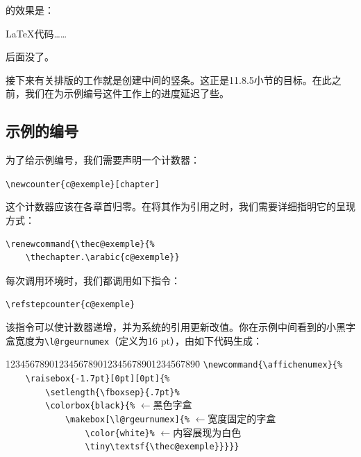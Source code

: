 的效果是：

\begin{ltxexempleii}
\LaTeX{}代码……
\par\noindent
后面没了。
\end{ltxexempleii}

接下来有关排版的工作就是创建中间的竖条。这正是11.8.5小节的目标。在此之前，我们在为示例编号这件工作上的进度延迟了些。

\subsection{示例的编号}

为了给示例编号，我们需要声明一个计数器：

\begin{dmd}
\verb|\newcounter{c@exemple}[chapter]|
\end{dmd}

这个计数器应该在各章首归零。在将其作为引用之时，我们需要详细指明它的呈现方式：

\begin{dmd}
\begin{verbatim}
\renewcommand{\thec@exemple}{% 
    \thechapter.\arabic{c@exemple}}\end{verbatim}
\end{dmd}

每次调用环境时，我们都调用如下指令：

\begin{dmd}
\verb|\refstepcounter{c@exemple}|
\end{dmd}

该指令可以使计数器递增，并为系统的引用更新改值。你在示例中间看到的小黑字盒宽度为\verb|\l@rgeurnumex|（定义为16 pt），由如下代码生成：

\begin{dmd}
\begin{tabbing}
1234567890123456789012345678901234567890\= \kill
\verb|\newcommand{\affichenumex}{% |\\
\verb|    \raisebox{-1.7pt}[0pt][0pt]{% |\\
\verb|        \setlength{\fboxsep}{.7pt}% |\\
\verb|        \colorbox{black}{%|\> $\leftarrow$\textsf{黑色字盒}\\
\verb|            \makebox[\l@rgeurnumex]{%|\> $\leftarrow$\textsf{宽度固定的字盒}\\
\verb|                \color{white}%|\> $\leftarrow$\textsf{内容展现为白色}\\
\verb|                \tiny\textsf{\thec@exemple}}}}}|
\end{tabbing}
\end{dmd}

